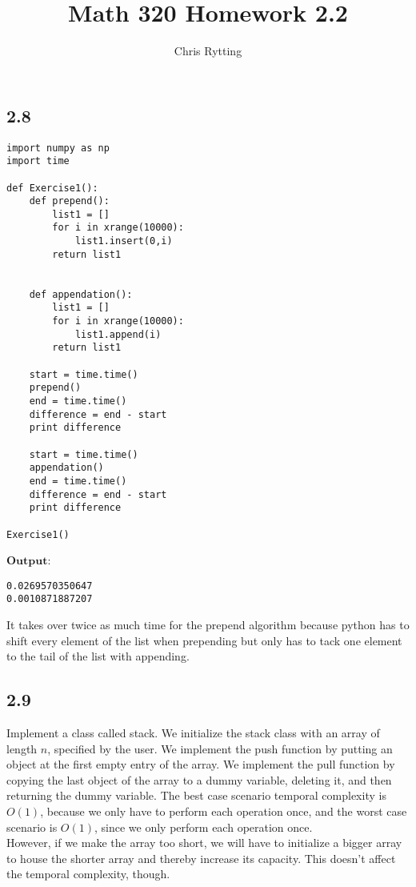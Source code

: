 \documentclass[letterpaper,12pt]{article}
\theoremstyle{definition}
\begin{document}
\title{Math 320 Homework 2.2}
\author{Chris Rytting}
\maketitle

\subsection*{2.8}
\begin{lstlisting}
import numpy as np
import time

def Exercise1():
    def prepend():
        list1 = []
        for i in xrange(10000):
            list1.insert(0,i)
        return list1


    def appendation():
        list1 = []
        for i in xrange(10000):
            list1.append(i)
        return list1

    start = time.time()
    prepend()
    end = time.time()
    difference = end - start 
    print difference

    start = time.time()
    appendation()
    end = time.time()
    difference = end - start 
    print difference

Exercise1()
\end{lstlisting}
$\mathbf{Output}$:
\begin{lstlisting}
0.0269570350647
0.0010871887207
\end{lstlisting}
It takes over twice as much time for the prepend algorithm because python has to shift every element of the list when prepending but only has to tack one element to the tail of the list with appending.

\subsection*{2.9}
Implement a class called stack. We initialize the stack class with an array of length $n$, specified by the user. We implement the push function by putting an object at the first empty entry of the array. We implement the pull function by copying the last object of the array to a dummy variable, deleting it, and then returning the dummy variable. The best case scenario temporal complexity is $O(1)$, because we only have to perform each operation once, and the worst case scenario is $O(1)$, since we only perform each operation once.\\
However, if we make the array too short, we will have to initialize a bigger array to house the shorter array and thereby increase its capacity. This doesn't affect the temporal complexity, though. 
\end{document}
